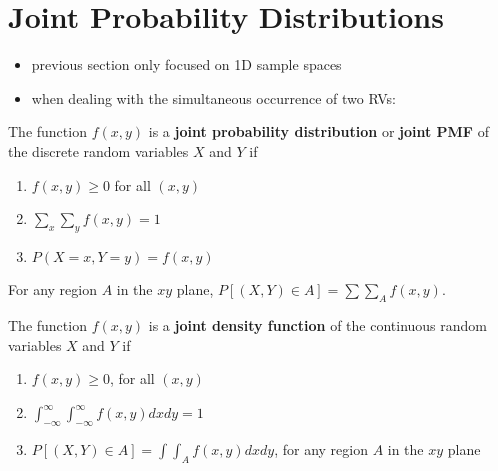 \documentclass[10pt]{article}
\begin{document}
\section{Joint Probability Distributions}
\begin{itemize}
    \item previous section only focused on 1D sample spaces
    \item when dealing with the simultaneous occurrence of two RVs:
\end{itemize}
\begin{definition}
    The function $f(x, y)$ is a \textbf{joint probability distribution} or \textbf{joint PMF} of the discrete random variables $X$ and $Y$ if
    \begin{enumerate}
        \item $f(x, y) \ge 0$ for all $(x, y)$
        \item $\sum_{x} \sum_{y} f(x, y) = 1$
        \item $P(X = x, Y = y) = f(x, y)$
    \end{enumerate}
    For any region $A$ in the $xy$ plane, $P\left[ (X, Y) \in A \right] = \sum \sum_{A} f(x, y)$.
\end{definition}
\begin{definition}
    The function $f(x, y)$ is a \textbf{joint density function} of the continuous random variables $X$ and $Y$ if 
    \begin{enumerate}
        \item $f(x,y) \ge 0$, for all $(x,y)$
        \item $\int_{-\infty}^{\infty} \int_{-\infty}^{\infty} f(x,y) dx dy = 1 $
        \item $P \left[ (X,Y) \in A \right] = \int \int_{A} f(x,y) dx dy $, for any region $A$ in the $xy$ plane
    \end{enumerate}
\end{definition}
\end{document}
